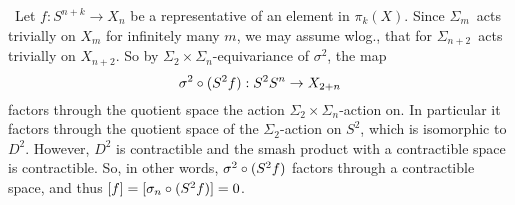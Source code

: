 \begin{exercise}[3]\ 
Let $f : S^{n+k} \to X_n$ be a representative of an element in $\pi_k(X)$.
Since $\Sigma_m$ acts trivially on $X_m$ for infinitely many $m$, we may assume
wlog., that for $\Sigma_{n+2}$ acts trivially on $X_{n+2}$. 
So by $\Sigma_2 \times \Sigma_n$-equivariance of $\sigma^2$, the map
\[ \sigma^2 \circ (S^2 \smash f) : S^2 \smash S^n \to X_{2+n} \]
factors through the quotient space the action $\Sigma_2 \times
\Sigma_n$-action on. In particular it factors through the quotient space of the
$\Sigma_2$-action on $S^2$, which is isomorphic to $D^2$. However, $D^2$ is
contractible and the smash product with a contractible space is contractible.
So, in other words,
$\sigma^2 \circ (S^2 \smash f)$ factors through a contractible space, and thus 
$[f] = [\sigma_n \circ (S^2 \smash f)] = 0$.
\end{exercise}


